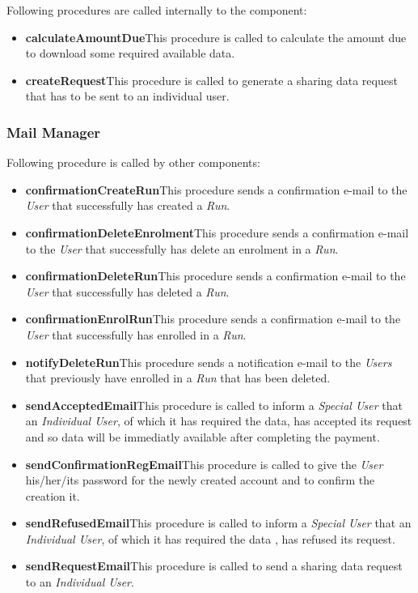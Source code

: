 \myparagraph{}
Following procedures are called internally to the component:
\begin{itemize}
  \item \textbf{calculateAmountDue}\quad This procedure is called to calculate the amount due to download some required available data.
  \item \textbf{createRequest}\quad This procedure is called to generate a sharing data request that has to be sent to an individual user.
\end{itemize}

\subsubsection{Mail Manager}
Following procedure is called by other components:
\begin{itemize}
  \item \textbf{confirmationCreateRun}\quad This procedure sends a confirmation e-mail to the \textit{User} that successfully has created a \textit{Run}.
  \item \textbf{confirmationDeleteEnrolment}\quad This procedure sends a confirmation e-mail to the \textit{User} that successfully has delete an enrolment in a \textit{Run}.
  \item \textbf{confirmationDeleteRun}\quad This procedure sends a confirmation e-mail to the \textit{User} that successfully has deleted a \textit{Run}.
  \item \textbf{confirmationEnrolRun}\quad This procedure sends a confirmation e-mail to the \textit{User} that successfully has enrolled in a \textit{Run}.
  \item \textbf{notifyDeleteRun}\quad This procedure sends a notification e-mail to the \textit{Users} that previously have enrolled in a \textit{Run} that has been deleted.
  \item \textbf{sendAcceptedEmail}\quad This procedure is called to inform a \textit{Special User} that an \textit{Individual User}, of which it has required the data, has accepted its request and so data will be immediatly available after completing the payment.
  \item \textbf{sendConfirmationRegEmail}\quad This procedure is called to give the \textit{User} his/her/its password for the newly created account and to confirm the creation it.
  \item \textbf{sendRefusedEmail}\quad This procedure is called to inform a \textit{Special User} that an \textit{Individual User}, of which it has required the data , has refused its request.
  \item \textbf{sendRequestEmail}\quad This procedure is called to send a sharing data request to an \textit{Individual User}.
\end{itemize}

